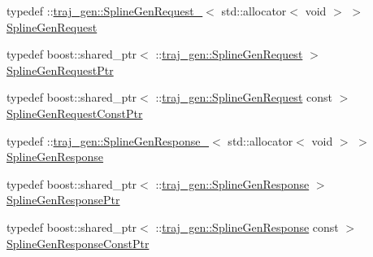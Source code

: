 \begin{DoxyCompactItemize}
\item 
typedef \+::\hyperlink{structtraj__gen_1_1_spline_gen_request__}{traj\+\_\+gen\+::\+Spline\+Gen\+Request\+\_\+}$<$ std\+::allocator$<$ void $>$ $>$ \hyperlink{namespacetraj__gen_a61c65203f503c18d4b3cb68b9ee74a74}{Spline\+Gen\+Request}
\item 
typedef boost\+::shared\+\_\+ptr$<$ \+::\hyperlink{namespacetraj__gen_a61c65203f503c18d4b3cb68b9ee74a74}{traj\+\_\+gen\+::\+Spline\+Gen\+Request} $>$ \hyperlink{namespacetraj__gen_adc2f856a76e36b50d0779534c24e40c9}{Spline\+Gen\+Request\+Ptr}
\item 
typedef boost\+::shared\+\_\+ptr$<$ \+::\hyperlink{namespacetraj__gen_a61c65203f503c18d4b3cb68b9ee74a74}{traj\+\_\+gen\+::\+Spline\+Gen\+Request} const  $>$ \hyperlink{namespacetraj__gen_ad74fd0e2dacfbba0b3bb66718756c8bb}{Spline\+Gen\+Request\+Const\+Ptr}
\item 
typedef \+::\hyperlink{structtraj__gen_1_1_spline_gen_response__}{traj\+\_\+gen\+::\+Spline\+Gen\+Response\+\_\+}$<$ std\+::allocator$<$ void $>$ $>$ \hyperlink{namespacetraj__gen_a96b15a7eb1a4a1209fba2e9d75acb7a4}{Spline\+Gen\+Response}
\item 
typedef boost\+::shared\+\_\+ptr$<$ \+::\hyperlink{namespacetraj__gen_a96b15a7eb1a4a1209fba2e9d75acb7a4}{traj\+\_\+gen\+::\+Spline\+Gen\+Response} $>$ \hyperlink{namespacetraj__gen_a3da53168ca7d2e5a300b8331d441b6bf}{Spline\+Gen\+Response\+Ptr}
\item 
typedef boost\+::shared\+\_\+ptr$<$ \+::\hyperlink{namespacetraj__gen_a96b15a7eb1a4a1209fba2e9d75acb7a4}{traj\+\_\+gen\+::\+Spline\+Gen\+Response} const  $>$ \hyperlink{namespacetraj__gen_a2e706ca6627e0739658db11c6f977abf}{Spline\+Gen\+Response\+Const\+Ptr}
\end{DoxyCompactItemize}
